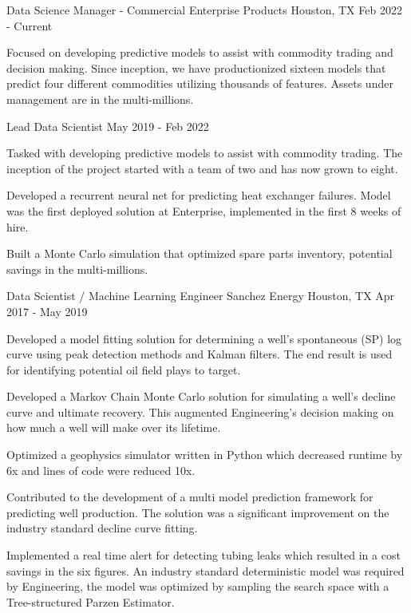 
\begin{cventries}

\cventry
{Data Science Manager - Commercial} %
{Enterprise Products} %
{Houston, TX} %
{Feb 2022 - Current} %
{ %
\begin{cvitems}
\item {Focused on developing predictive models to assist with commodity trading and decision making. Since inception, we have productionized sixteen models that predict four different commodities utilizing thousands of features. Assets under management are in the multi-millions.}
\end{cvitems}
}

\cventry
{Lead Data Scientist} %
{} %
{} %
{May 2019 - Feb 2022} %
{ %
\begin{cvitems}
\item {Tasked with developing predictive models to assist with commodity trading. The inception of the project started with a team of two and has now grown to eight.}
\item {Developed a recurrent neural net for predicting heat exchanger failures. Model was the first deployed solution at Enterprise, implemented in the first 8 weeks of hire.}
\item {Built a Monte Carlo simulation that optimized spare parts inventory, potential savings in the multi-millions.}
\end{cvitems}
}


\cventry
{Data Scientist / Machine Learning Engineer} %
{Sanchez Energy} %
{Houston, TX} %
{Apr 2017 - May 2019} %
{ %
\begin{cvitems}
\item {Developed a model fitting solution for determining a well's spontaneous (SP) log curve using peak detection methods and Kalman filters. The end result is used for identifying potential oil field plays to target.}
\item {Developed a Markov Chain Monte Carlo solution for simulating a well's decline curve and ultimate recovery. This augmented Engineering's decision making on how much a well will make over its lifetime.}
\item {Optimized a geophysics simulator written in Python which decreased runtime by 6x and lines of code were reduced 10x.}
\item {Contributed to the development of a multi model prediction framework for predicting well production. The solution was a significant improvement on the industry standard decline curve fitting.}
\item {Implemented a real time alert for detecting tubing leaks which resulted in a cost savings in the six figures. An industry standard deterministic model was required by Engineering, the model was optimized by sampling the search space with a Tree-structured Parzen Estimator.}
\end{cvitems}
}



\end{cventries}
